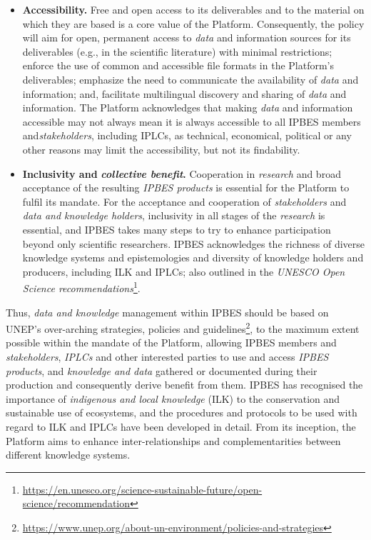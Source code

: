 \documentclass{article}
\begin{document}
\begin{itemize}
    \item \textbf{Accessibility.} Free and open access to its deliverables and to the material on which they are based is a core value of the Platform. Consequently, the policy will aim for open, permanent access to \textit{data} and information sources for its deliverables (e.g., in the scientific literature) with minimal restrictions; enforce the use of common and accessible file formats in the Platform’s deliverables; emphasize the need to communicate the availability of \textit{data} and information; and, facilitate multilingual discovery and sharing of \textit{data} and information. The Platform acknowledges that making \textit{data} and information accessible may not always mean it is always accessible to all IPBES members and\textit{stakeholders}, including IPLCs, as technical, economical, political or any other reasons may limit the accessibility, but not its findability.
    \item \textbf{Inclusivity and }\textit{\textbf{collective benefit}}\textbf{.} Cooperation in \textit{research} and broad acceptance of the resulting \textit{IPBES products} is essential for the Platform to fulfil its mandate. For the acceptance and cooperation of \textit{stakeholders} and \textit{data and knowledge holders}, inclusivity in all stages of the \textit{research} is essential, and IPBES takes many steps to try to enhance participation beyond only scientific researchers. IPBES acknowledges the richness of diverse knowledge systems and epistemologies and diversity of knowledge holders and producers, including ILK and IPLCs; also outlined in the \textit{UNESCO Open Science recommendations}\footnote{  \url{https://en.unesco.org/science-sustainable-future/open-science/recommendation}}. 
\end{itemize}

Thus, \textit{data and knowledge }management within IPBES should be based on UNEP’s over-arching strategies, policies and guidelines\footnote{\url{https://www.unep.org/about-un-environment/policies-and-strategies}}, to the maximum extent possible within the mandate of the Platform, allowing IPBES members and \textit{stakeholders}, \textit{IPLCs} and other interested parties to use and access \textit{IPBES products}, and \textit{knowledge and data} gathered or documented during their production and consequently derive benefit from them. IPBES has recognised the importance of \textit{indigenous and local knowledge }(ILK) to the conservation and sustainable use of ecosystems, and the procedures and protocols to be used with regard to ILK and IPLCs have been developed in detail. From its inception, the Platform aims to enhance inter-relationships and complementarities between different knowledge systems.
\end{document}
